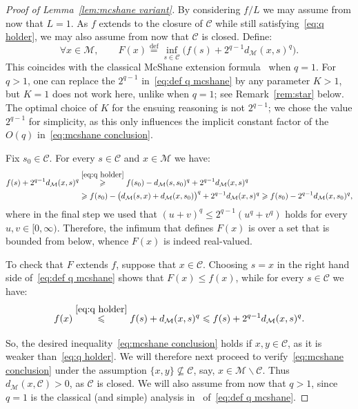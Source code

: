 \documentclass[11pt,reqno]{amsart}
\renewcommand{\le}{\leqslant}
\renewcommand{\ge}{\geqslant}
\renewcommand{\setminus}{\smallsetminus}
\newcommand{\eqdef}{\stackrel{\mathrm{def}}{=}}
\newcommand{\MM}{\mathcal{M}}
\newcommand{\sub}{\mathscr{C}}
\begin{document}
\begin{proof}[Proof of Lemma~\ref{lem:mcshane variant}] By considering $f/L$ we may assume from now that $L=1$. As $f$ extends to the closure of $\sub$ while still satisfying~\eqref{eq:q holder}, we may also assume from now that $\sub$ is closed.  Define:
\begin{equation}\label{eq:def q mcshane}
\forall x\in \MM,\qquad F(x)\eqdef \inf_{s\in \sub} \big(f(s)+2^{q-1}d_\MM(x,s)^q\big). 
\end{equation}
This coincides with the classical McShane extension formula~\cite{McS34} when $q=1$. For $q>1$, one can replace the  $2^{q-1}$ in~\eqref{eq:def q mcshane} by any parameter $K>1$, but $K=1$ does not work here, unlike when $q=1$; see Remark~\ref{rem:star} below.    The optimal choice of $K$ for the ensuing reasoning is not $2^{q-1}$; we chose the value $2^{q-1}$ for simplicity, as this only influences the implicit constant factor of the $O(q)$ in~\eqref{eq:mcshane conclusion}. 

Fix $s_0\in \sub$. For every $s\in \sub$ and $x\in \MM$ we have: 
\begin{align}\label{eq:not b-infty}
\begin{split}
f(s)+2^{q-1}d_\MM(x,s)^q&\stackrel{\eqref{eq:q holder}}{\ge} f(s_0)-d_\MM(s,s_0)^q+2^{q-1}d_\MM(x,s)^q\\&\ge f(s_0)-\big(d_\MM(s,x)+d_\MM(x,s_0)\big)^q+2^{q-1}d_\MM(x,s)^q\ge f(s_0)-2^{q-1}d_\MM(x,s_0)^q,
\end{split}
\end{align}
where in the final step we used that $(u+v)^q\le 2^{q-1}(u^q+v^q)$ holds for every $u,v\in [0,\infty)$. Therefore, the infimum that defines $F(x)$ is over a set that is bounded from below, whence $F(x)$ is indeed real-valued. 

To check that $F$ extends $f$, suppose that $x\in \sub$. Choosing $s=x$ in the right hand side of~\eqref{eq:def q mcshane} shows  that $F(x)\le f(x)$, while for every $s\in \sub$ we have: 
\begin{equation}\label{eq:F extends}
f(x)\stackrel{\eqref{eq:q holder}}{\le} f(s)+d_\MM(x,s)^q\le f(s)+2^{q-1}d_\MM(x,s)^q.
\end{equation}


So, the desired inequality~\eqref{eq:mcshane conclusion} holds if $x,y\in \sub$, as it is weaker than~\eqref{eq:q holder}. We will therefore next proceed to verify~\eqref{eq:mcshane conclusion} under the assumption $\{x,y\}\not\subseteq \sub$, say, $x\in \MM\setminus \sub$. Thus $d_\MM(x,\sub)>0$, as $\sub$ is closed. We will also assume from now that $q>1$, since $q=1$ is the classical (and simple) analysis in~\cite{McS34} of~\eqref{eq:def q mcshane}.  


\end{proof}
\end{document}
